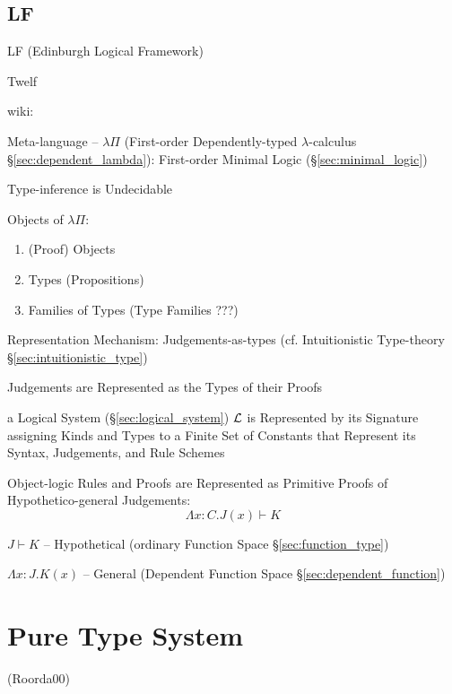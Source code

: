 \subsection{LF}\label{sec:lf}

LF (Edinburgh Logical Framework)

Twelf


wiki:

Meta-language -- $\lambda\Pi$ (First-order Dependently-typed
$\lambda$-calculus \S\ref{sec:dependent_lambda}): First-order Minimal
Logic (\S\ref{sec:minimal_logic})

\fist Type-inference is Undecidable %

Objects of $\lambda\Pi$:
\begin{enumerate}
  \item (Proof) Objects
  \item Types (Propositions)
  \item Families of Types (Type Families ???)
\end{enumerate}

Representation Mechanism: Judgements-as-types (cf. Intuitionistic
Type-theory \S\ref{sec:intuitionistic_type})

Judgements are Represented as the Types of their Proofs

a Logical System (\S\ref{sec:logical_system}) $\mathcal{L}$ is
Represented by its Signature assigning Kinds and Types to a Finite Set
of Constants that Represent its Syntax, Judgements, and Rule Schemes

Object-logic Rules and Proofs are Represented as Primitive Proofs of
Hypothetico-general Judgements:
\[
  \Lambda x:C.J(x) \vdash K
\]

$J \vdash K$ -- Hypothetical (ordinary Function Space
\S\ref{sec:function_type})

$\Lambda x:J.K(x)$ -- General (Dependent Function Space
\S\ref{sec:dependent_function})



\section{Pure Type System}\label{sec:pts}

(Roorda00) %

